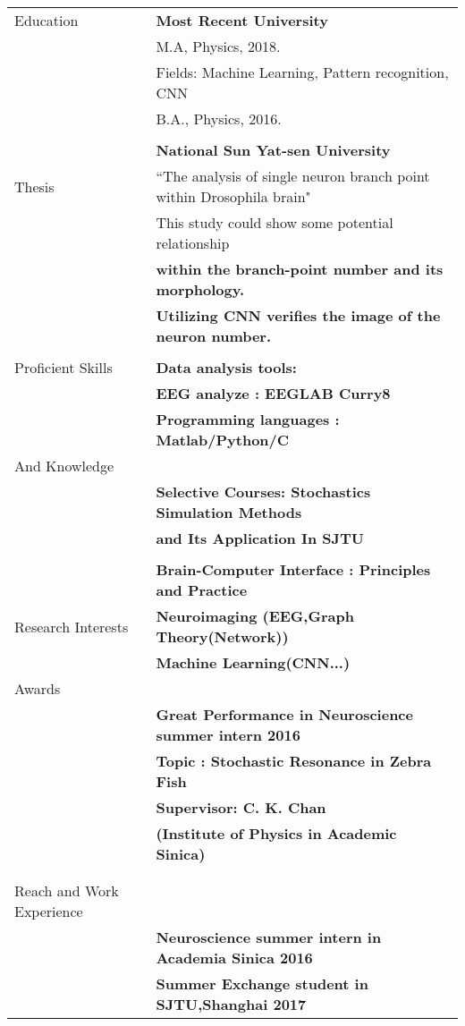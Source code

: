 \documentclass[letterpaper,11pt,oneside]{article}
\begin{document}
\noindent \begin{tabular}{@{} l l}
 \Large{Education}    & \textbf{Most Recent University} \\
     & M.A, Physics, 2018. \\
     & Fields: Machine Learning, Pattern recognition, CNN \\
     & B.A., Physics, 2016. \\
     &\\
     & \textbf{National Sun Yat-sen University} \\
 \Large{Thesis}    & ``The analysis of single neuron branch point within Drosophila brain" \\
    & \parbox{5.0in}{This study could show some potential relationship}\\
    & \textbf{ within the
       branch-point number and its morphology.}\\
    & \textbf{Utilizing CNN verifies the image of the   neuron number. }\\
    & \\
 \Large{Proficient Skills  }    & \textbf{Data analysis tools: } \\
    & \textbf{EEG analyze : EEGLAB Curry8} \\
    & \textbf{Programming languages  : Matlab/Python/C} \\
 \Large{And Knowledge}  \\
    &\textbf{Selective Courses: Stochastics Simulation Methods}  \\
    &\textbf{and Its Application In SJTU}\\
    &\\
    &\textbf{Brain-Computer Interface : Principles and Practice}
&\\
\Large{Research Interests  } & \textbf{Neuroimaging (EEG,Graph Theory(Network))  } \\
& \textbf{Machine Learning(CNN...)} \\
\Large{Awards}\\
& \textbf{Great Performance in Neuroscience summer intern 2016}\\
& \textbf{Topic : Stochastic Resonance in Zebra Fish}\\
& \textbf{Supervisor: C. K. Chan}\\
& \textbf{(Institute of Physics in Academic Sinica) }\\
&\\
&\\
\Large{Reach and Work Experience}\\
& \textbf{ Neuroscience summer intern in Academia Sinica 2016}\\
 &\textbf{ Summer Exchange student in SJTU,Shanghai 2017}
\end{tabular}
\end{document}
